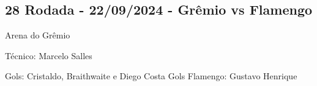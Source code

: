 \newpage
\subsection{28 Rodada - 22/09/2024 - Grêmio vs Flamengo}

\begin{figure}[H]
    \centering
    
\end{figure}

Arena do Grêmio

Técnico: Marcelo Salles

Gols: Cristaldo, Braithwaite e Diego Costa
Gols Flamengo: Gustavo Henrique 